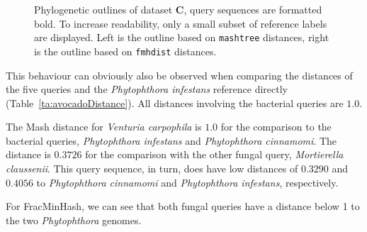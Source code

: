 \begin{figure}
\begin{subfigure}{0.49\textwidth}
  \end{subfigure}
  \caption[Phylogenetic outlines of dataset \textbf{C}]{Phylogenetic outlines of
  dataset \textbf{C}, query sequences are formatted bold. To increase
  readability, only a small subset of reference labels are displayed. Left is
  the outline based on \texttt{mashtree} distances, right is the outline based
  on \texttt{fmhdist} distances.}
  \label{fig:avocadoOutlineComparison}
\end{figure}

This behaviour can obviously also be observed when comparing the distances of
the five queries and the \textit{Phytophthora infestans} reference directly
(Table~\ref{ta:avocadoDistance}). All distances involving the bacterial queries
are $1.0$.

The Mash distance for \textit{Venturia carpophila} is $1.0$ for the comparison
to the bacterial queries, \textit{Phytophthora infestans} and
\textit{Phytophthora cinnamomi}. The distance is $0.3726$ for the comparison
with the other fungal query, \textit{Mortierella claussenii}. This query
sequence, in turn, does have low distances of $0.3290$ and $0.4056$ to
\textit{Phytophthora cinnamomi} and \textit{Phytophthora infestans},
respectively.

For FracMinHash, we can see that both fungal queries have a distance below 1 to
the two \textit{Phytophthora} genomes.


